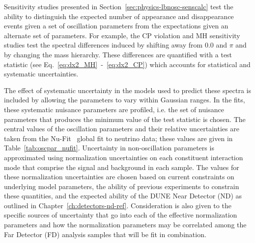 Sensitivity studies presented in Section~\ref{sec:physics-lbnosc-senscalc} test the ability to distinguish
the expected number of \nue appearance and \numu disappearance events given a set of oscillation parameters
from the expectations given an alternate set of parameters. For example, the CP violation and MH sensitivity
studies test the spectral differences induced by shifting \deltacp away from 0.0 and $\pi$ and by changing the
mass hierarchy. These differences are quantified with a test statistic (see Eq.~\ref{eq:dx2_MH}~-~\ref{eq:dx2_CP}) 
which accounts for statistical and systematic uncertainties. 

The effect of systematic uncertainty in the models used to 
predict these spectra is included by allowing the parameters to vary within Gaussian ranges. In the fits,
these systematic nuisance parameters are profiled, i.e. the set of nuisance parameters that produces the
minimum value of the test statistic is chosen.  The central values of the oscillation
parameters and their relative uncertainties are taken from the Nu-Fit~\cite{Gonzalez-Garcia:2014bfa} global
fit to neutrino data; these values are given in Table~\ref{tab:oscpar_nufit}. Uncertainty in non-oscillation
parameters is approximated using
normalization uncertainties on each constituent interaction mode that comprise the signal and background
in each sample. The values for these normalization uncertainties are chosen based on current constraints
on underlying model parameters, the ability of previous experiments to constrain these quantities,
and the expected ability of the DUNE Near Detector (ND) as outlined in Chapter~\ref{ch:detectors-nd-ref}.
Consideration is also given to the specific sources of uncertainty that go into each of the effective normalization
parameters and how the normalization parameters
may be correlated among the Far Detector (FD) analysis samples that will be fit in combination.



